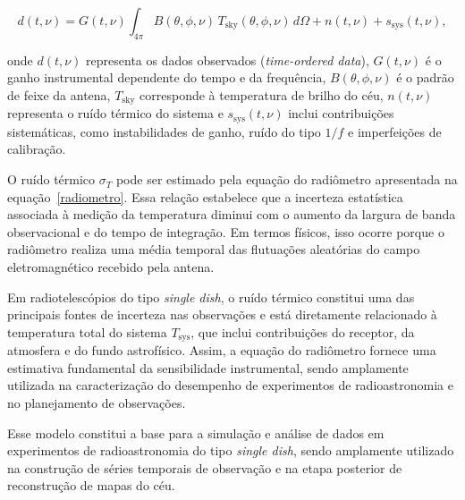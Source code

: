\begin{equation}
d(t,\nu) =
G(t,\nu)
\int_{4\pi}
B(\theta,\phi,\nu)\,
T_{\mathrm{sky}}(\theta,\phi,\nu)\,
d\Omega
+
n(t,\nu)
+
s_{\mathrm{sys}}(t,\nu),
\label{modelo_medicao_bingo}
\end{equation}

onde \(d(t,\nu)\) representa os dados observados (\textit{time-ordered data}), \(G(t,\nu)\) é o ganho instrumental dependente do tempo e da frequência, \(B(\theta,\phi,\nu)\) é o padrão de feixe da antena, \(T_{\mathrm{sky}}\) corresponde à temperatura de brilho do céu, \(n(t,\nu)\) representa o ruído térmico do sistema e \(s_{\mathrm{sys}}(t,\nu)\) inclui contribuições sistemáticas, como instabilidades de ganho, ruído do tipo \(1/f\) e imperfeições de calibração.

O ruído térmico \(\sigma_T\) pode ser estimado pela equação do radiômetro apresentada na equação~\eqref{radiometro}. Essa relação estabelece que a incerteza estatística associada à medição da temperatura diminui com o aumento da largura de banda observacional e do tempo de integração. Em termos físicos, isso ocorre porque o radiômetro realiza uma média temporal das flutuações aleatórias do campo eletromagnético recebido pela antena.

Em radiotelescópios do tipo \textit{single dish}, o ruído térmico constitui uma das principais fontes de incerteza nas observações e está diretamente relacionado à temperatura total do sistema \(T_{\mathrm{sys}}\), que inclui contribuições do receptor, da atmosfera e do fundo astrofísico. Assim, a equação do radiômetro fornece uma estimativa fundamental da sensibilidade instrumental, sendo amplamente utilizada na caracterização do desempenho de experimentos de radioastronomia e no planejamento de observações.


Esse modelo constitui a base para a simulação e análise de dados em experimentos de radioastronomia do tipo \textit{single dish}, sendo amplamente utilizado na construção de séries temporais de observação e na etapa posterior de reconstrução de mapas do céu.
